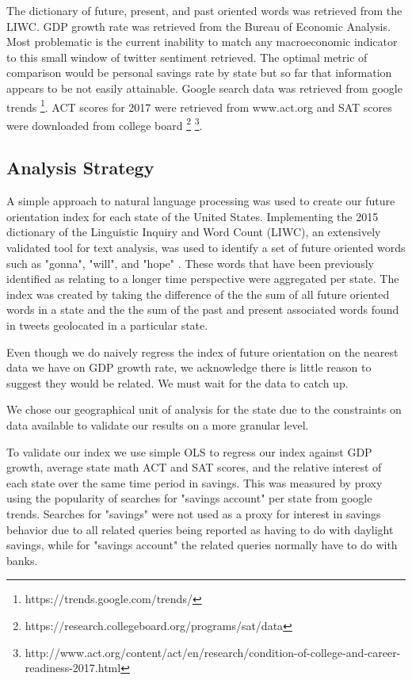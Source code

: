 \documentclass{article}
\begin{document}
The dictionary of future, present, and past oriented words was retrieved from the LIWC. 
GDP growth rate was retrieved from the Bureau of Economic Analysis. Most problematic is the current inability to match any macroeconomic indicator to this small window of twitter sentiment retrieved. The optimal metric of comparison would be personal savings rate by state but so far that information appears to be not easily attainable. Google search data was retrieved from google trends \footnote{https://trends.google.com/trends/}. ACT scores for 2017 were retrieved from www.act.org and SAT scores were downloaded from college board \footnote{https://research.collegeboard.org/programs/sat/data}  \footnote{http://www.act.org/content/act/en/research/condition-of-college-and-career-readiness-2017.html}.


\subsection{Analysis Strategy}
A simple approach to natural language processing was used to create our future orientation index for each state of the United States. Implementing the 2015 dictionary of the Linguistic Inquiry and Word Count (LIWC), an extensively validated tool for text analysis, was used to identify a set of future oriented words such as "gonna", "will", and "hope" \cite{pennebaker2015development}. These words that have been previously identified as relating to a longer time perspective were aggregated per state. The index was created by taking the difference of the the sum of all future oriented words in a state and the the sum of the past and present associated words found in tweets geolocated in a particular state. 

Even though we do naively regress the index of future orientation on the nearest data we have on GDP growth rate, we acknowledge there is little reason to suggest they would be related. We must wait for the data to catch up. 

We chose our geographical unit of analysis for the state due to the constraints on data available to validate our results on a more granular level.

To validate our index we use simple OLS to regress our index against GDP growth, average state math ACT and SAT scores, and the relative interest of each state over the same time period in savings. This was measured by proxy using the popularity of searches for "savings account" per state from google trends. Searches for "savings" were not used as a proxy for interest in savings behavior due to all related queries being reported as having to do with daylight savings, while for "savings account" the related queries normally have to do with banks. 
\end{document}
